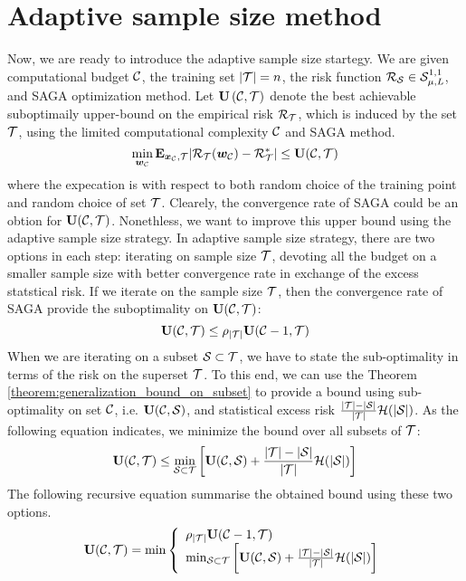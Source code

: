 \documentclass{article}
\begin{document}
\section{Adaptive sample size method}
Now, we are ready to introduce the adaptive sample size startegy. We are given
computational budget ${\cal C}$, the training set $|{\cal T}| = n$, the risk function
${\cal R}_{{\cal S}} \in {\cal S}_{\mu,L}^{1,1}$, and SAGA optimization method.  Let
$\mathbf U\left({\cal C},{\cal T}\right)$ denote the best achievable suboptimaily upper-bound on
the empirical risk ${\cal R}_{{\cal T}}$, which is induced by the set ${\cal T}$, using the
limited computational complexity ${\cal C}$ and SAGA method.
\begin{equation*}
	  \min_{\bm{w}_{{\cal C}}} \mathbf{E}_{\bm{x}_{{\cal C}}, {\cal T}}| {\cal R}_{{\cal T}}(\bm{w}_{{\cal C}}) - {\cal R}_{{\cal T}}^* | \leq
	  \mathbf U({\cal C},{\cal T})
\end{equation*} 
where the expecation is with respect to both random choice of the training point
and random choice of set ${\cal T}$. 
 Clearely, the
convergence rate of SAGA could be an obtion for $\mathbf U({\cal C},{\cal T})$.
Nonethless, we want to improve this upper bound using the adaptive sample size strategy. In
adaptive sample size strategy, there are two options in each step: iterating on
sample size ${\cal T}$, devoting all the budget on a smaller sample size with better convergence rate in exchange of the excess statstical
risk. If we iterate on the sample size ${\cal T}$, then the convergence rate of SAGA
provide the suboptimality on $\mathbf U({\cal C},{\cal T})$: 
\begin{equation*}
	\mathbf U({\cal C},{\cal T}) \leq \rho_{|{\cal T}|} \mathbf U({\cal C}-1,{\cal T})
\end{equation*}
 When we are iterating on a
subset ${\cal S} \subset {\cal T}$, we have to state the
sub-optimality in terms of the risk on the superset ${\cal T}$. To this end, we can use
the Theorem \ref{theorem:generalization_bound_on_subset} to provide a bound
using sub-optimality on set ${\cal C}$, i.e. $\mathbf U({\cal C},{\cal S})$, and statistical excess risk
$\frac{|{\cal T}| - |{\cal S}|}{|{\cal T}|}{\cal H}(|{\cal S}|)$. As the following equation indicates,
we minimize the bound over all subsets of ${\cal T}$:
\begin{equation*}
	\mathbf U({\cal C},{\cal T}) \leq \min_{{\cal S} \subset {\cal T}} \bigg[\mathbf U({\cal C},{\cal S}) + \frac{|{\cal T}| - |{\cal S}|}{|{\cal T}|}
		{\cal H}(|{\cal S}|) \bigg]
\end{equation*}
The following
recursive equation summarise the obtained bound using these two options.
\begin{equation*}
	\mathbf U({\cal C},{\cal T}) = \min
\left\{
	\begin{array}{ll}
		 \rho_{|{\cal T}|} \mathbf U({\cal C}-1,{\cal T})\\
		\min_{{\cal S} \subset {\cal T}} \bigg[\mathbf U({\cal C},{\cal S}) + \frac{|{\cal T}| - |{\cal S}|}{|{\cal T}|}
		{\cal H}(|{\cal S}|) \bigg]
	\end{array}
\right.
\end{equation*}
\end{document}

